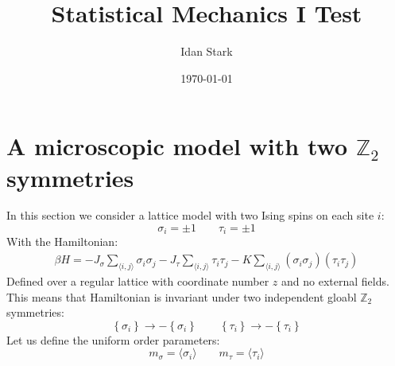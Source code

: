 \documentclass{article}
\title{Statistical Mechanics I Test}
\author{Idan Stark}
\date{\today}
\newcommand{\Z}{\ensuremath{\mathbb{Z}}}
\begin{document}
\maketitle

\section{A microscopic model with two $\Z_2$ symmetries}
In this section we consider a lattice model with two Ising spins on each site $i$:
\begin{equation}
    \sigma_i =\pm1 \qquad \tau_i = \pm1
\end{equation}
With the Hamiltonian:
\begin{eqnarray}
    \beta H = -J_\sigma \sum_{\langle i, j \rangle}\sigma_i \sigma_j -J_\tau \sum_{\langle i, j \rangle}\tau_i \tau_j - K \sum_{\langle i, j \rangle}(\sigma_i \sigma_j)(\tau_i \tau_j)
\end{eqnarray}
Defined over a regular lattice with coordinate number $z$ and no external fields. This means that Hamiltonian is invariant under two independent gloabl $\Z_2$ symmetries:
\begin{equation}
    \left\{\sigma_i\right\} \rightarrow -\left\{\sigma_i\right\}
    \qquad
    \left\{\tau_i\right\} \rightarrow -\left\{\tau_i\right\}
\end{equation}
Let us define the uniform order parameters:
\begin{equation}
    m_\sigma = \langle \sigma_i \rangle
    \qquad
    m_\tau = \langle \tau_i \rangle
\end{equation}
\end{document}
